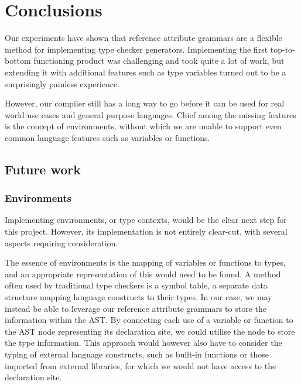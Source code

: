 \documentclass[nofilelist]{cslthse-msc}
\begin{document}
\chapter{Conclusions} %
Our experiments have shown that reference attribute grammars are a flexible method for implementing type checker generators.
Implementing the first top-to-bottom functioning product was challenging and took quite a lot of work, but extending it with additional features such as type variables turned out to be a surprisingly painless experience.

However, our compiler still has a long way to go before it can be used for real world use cases and general purpose languages.
Chief among the missing features is the concept of environments, without which we are unable to support even common language features such as variables or functions.

\section{Future work}
\subsection{Environments}
Implementing environments, or type contexts, would be the clear next step for this project.
However, its implementation is not entirely clear-cut, with several aspects requiring consideration.

The essence of environments is the mapping of variables or functions to types, and an appropriate representation of this would need to be found.
A method often used by traditional type checkers is a symbol table, a separate data structure mapping language constructs to their types.
In our case, we may instead be able to leverage our reference attribute grammars to store the information within the AST.
By connecting each use of a variable or function to the AST node representing its declaration site, we could utilise the node to store the type information.
This approach would however also have to consider the typing of external language constructs, such as built-in functions or those imported from external libraries, for which we would not have access to the declaration site.
\end{document}
